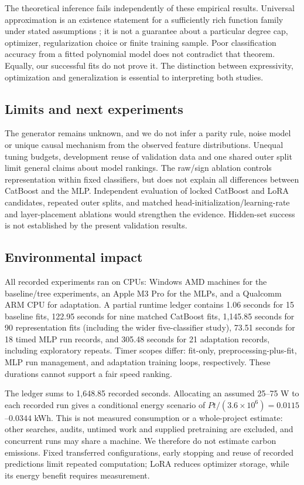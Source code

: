 \documentclass{article}
\begin{document}
The theoretical inference fails independently of these empirical results. Universal approximation is an existence statement for a sufficiently rich function family under stated assumptions \cite{leshno1993}; it is not a guarantee about a particular degree cap, optimizer, regularization choice or finite training sample. Poor classification accuracy from a fitted polynomial model does not contradict that theorem. Equally, our successful fits do not prove it. The distinction between expressivity, optimization and generalization is essential to interpreting both studies.

\subsection{Limits and next experiments}
The generator remains unknown, and we do not infer a parity rule, noise model or unique causal mechanism from the observed feature distributions. Unequal tuning budgets, development reuse of validation data and one shared outer split limit general claims about model rankings. The raw/sign ablation controls representation within fixed classifiers, but does not explain all differences between CatBoost and the MLP. Independent evaluation of locked CatBoost and LoRA candidates, repeated outer splits, and matched head-initialization/learning-rate and layer-placement ablations would strengthen the evidence. Hidden-set success is not established by the present validation results.

\subsection{Environmental impact}
All recorded experiments ran on CPUs: Windows AMD machines for the baseline/tree experiments, an Apple M3 Pro for the MLPs, and a Qualcomm ARM CPU for adaptation. A partial runtime ledger contains 1.06 seconds for 15 baseline fits, 122.95 seconds for nine matched CatBoost fits, 1,145.85 seconds for 90 representation fits (including the wider five-classifier study), 73.51 seconds for 18 timed MLP run records, and 305.48 seconds for 21 adaptation records, including exploratory repeats. Timer scopes differ: fit-only, preprocessing-plus-fit, MLP run management, and adaptation training loops, respectively. These durations cannot support a fair speed ranking.

The ledger sums to 1,648.85 recorded seconds. Allocating an assumed 25--75 W to each recorded run gives a conditional energy scenario of $Pt/(3.6\times10^6)=0.0115$--$0.0344$ kWh. This is not measured consumption or a whole-project estimate: other searches, audits, untimed work and supplied pretraining are excluded, and concurrent runs may share a machine. We therefore do not estimate carbon emissions. Fixed transferred configurations, early stopping and reuse of recorded predictions limit repeated computation; LoRA reduces optimizer storage, while its energy benefit requires measurement.
\end{document}
